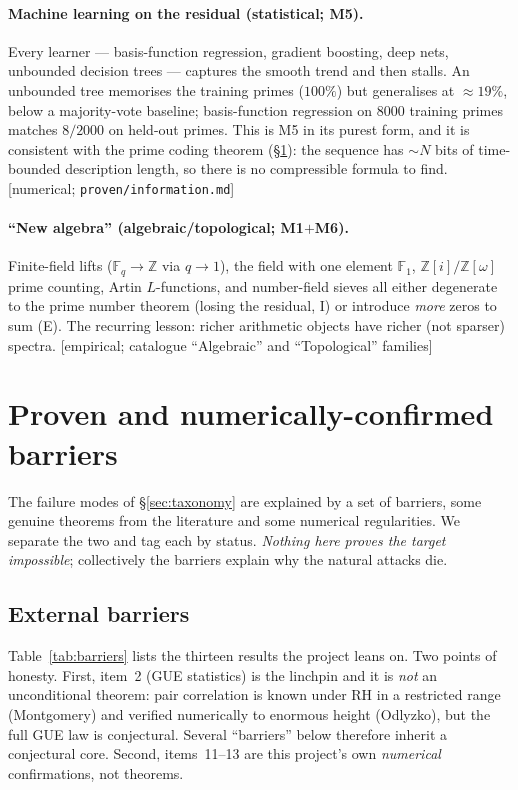 \documentclass[11pt]{article}
\theoremstyle{plain}
\theoremstyle{definition}
\theoremstyle{remark}
\newcommand{\stat}[1]{\quad\textnormal{\footnotesize\textsf{[\textcolor{accent}{#1}]}}}
\begin{document}
\paragraph{Machine learning on the residual (statistical; M5).}
Every learner --- basis-function regression, gradient boosting, deep nets,
unbounded decision trees --- captures the smooth trend and then stalls. An
unbounded tree memorises the training primes ($100\%$) but generalises at
${\approx}19\%$, below a majority-vote baseline; basis-function regression on
$8000$ training primes matches $8/2000$ on held-out primes. This is M5 in its
purest form, and it is consistent with the prime coding theorem
(\S\ref{sec:barriers}): the sequence has ${\sim}N$ bits of time-bounded
description length, so there is no compressible formula to find.
\stat{numerical; \texttt{proven/information.md}}

\paragraph{``New algebra'' (algebraic/topological; M1$+$M6).}
Finite-field lifts ($\mathbb{F}_q\to\mathbb{Z}$ via $q\to1$), the field with one
element $\mathbb{F}_1$, $\mathbb{Z}[i]/\mathbb{Z}[\omega]$ prime counting, Artin
$L$-functions, and number-field sieves all either degenerate to the prime number
theorem (losing the residual, I) or introduce \emph{more} zeros to sum (E). The
recurring lesson: richer arithmetic objects have richer (not sparser) spectra.
\stat{empirical; catalogue ``Algebraic'' and ``Topological'' families}

\section{Proven and numerically-confirmed barriers}
\label{sec:barriers}

The failure modes of \S\ref{sec:taxonomy} are explained by a set of barriers,
some genuine theorems from the literature and some numerical regularities. We
separate the two and tag each by status. \emph{Nothing here proves the target
impossible}; collectively the barriers explain why the natural attacks die.

\subsection{External barriers}

Table~\ref{tab:barriers} lists the thirteen results the project leans on. Two
points of honesty. First, item~2 (GUE statistics) is the linchpin and it is
\emph{not} an unconditional theorem: pair correlation is known under RH in a
restricted range (Montgomery) and verified numerically to enormous height
(Odlyzko), but the full GUE law is conjectural. Several ``barriers'' below
therefore inherit a conjectural core. Second, items~11--13 are this project's own
\emph{numerical} confirmations, not theorems.
\end{document}
